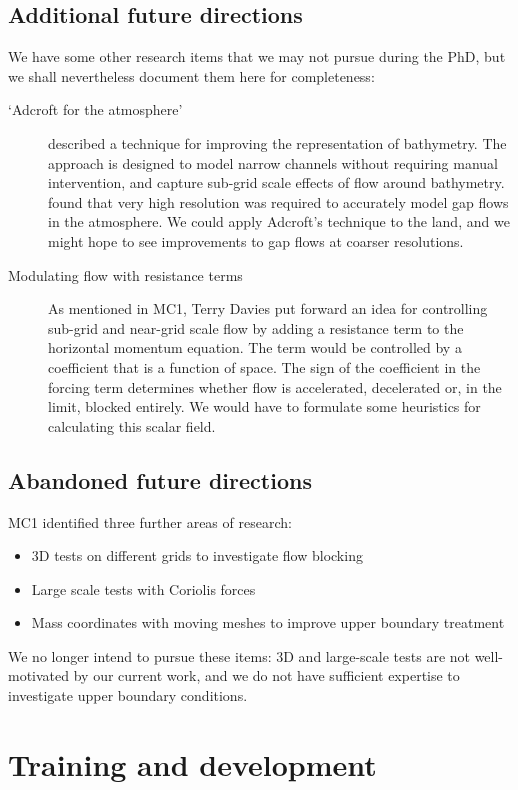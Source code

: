 \documentclass[a4paper]{article}
\begin{document}
\subsection*{Additional future directions}
We have some other research items that we may not pursue during the PhD, but we shall nevertheless document them here for completeness:
\begin{description}
	\item[`Adcroft for the atmosphere']{\citet{adcroft2013} described a technique for improving the representation of bathymetry.  The approach is designed to model narrow channels without requiring manual intervention, and capture sub-grid scale effects of flow around bathymetry.  \citet{gohm2004} found that very high resolution was required to accurately model gap flows in the atmosphere.  We could apply Adcroft's technique to the land, and we might hope to see improvements to gap flows at coarser resolutions.}
	\item[Modulating flow with resistance terms]{As mentioned in MC1, Terry Davies put forward an idea for controlling sub-grid and near-grid scale flow by adding a resistance term to the horizontal momentum equation.  The term would be controlled by a coefficient that is a function of space.  The sign of the coefficient in the forcing term determines whether flow is accelerated, decelerated or, in the limit, blocked entirely.  We would have to formulate some heuristics for calculating this scalar field.}
\end{description}

\subsection*{Abandoned future directions}
MC1 identified three further areas of research:
\begin{itemize}
	\item 3D tests on different grids to investigate flow blocking
	\item Large scale tests with Coriolis forces
	\item Mass coordinates with moving meshes to improve upper boundary treatment
\end{itemize}
We no longer intend to pursue these items: 3D and large-scale tests are not well-motivated by our current work, and we do not have sufficient expertise to investigate upper boundary conditions.

\section{Training and development}
\end{document}
